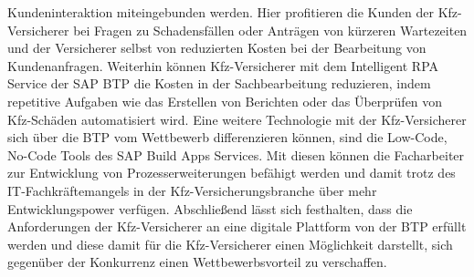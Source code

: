 Kundeninteraktion miteingebunden werden. Hier profitieren die Kunden der Kfz-Versicherer bei Fragen zu Schadensfällen oder Anträgen von kürzeren Wartezeiten und der Versicherer selbst von reduzierten Kosten bei der Bearbeitung von Kundenanfragen. Weiterhin können Kfz-Versicherer mit dem Intelligent RPA Service der SAP BTP die Kosten in der Sachbearbeitung reduzieren, indem repetitive Aufgaben wie das Erstellen von Berichten oder das Überprüfen von Kfz-Schäden automatisiert wird. Eine weitere Technologie mit der Kfz-Versicherer sich über die BTP vom Wettbewerb differenzieren können, sind die Low-Code, No-Code Tools des SAP Build Apps Services. Mit diesen können die Facharbeiter zur Entwicklung von Prozesserweiterungen befähigt werden und damit trotz des IT-Fachkräftemangels in der Kfz-Versicherungsbranche über mehr Entwicklungspower verfügen.
Abschließend lässt sich festhalten, dass die Anforderungen der Kfz-Versicherer an eine digitale Plattform von der BTP erfüllt werden und diese damit für die Kfz-Versicherer einen Möglichkeit darstellt, sich gegenüber der Konkurrenz einen Wettbewerbsvorteil zu verschaffen.








